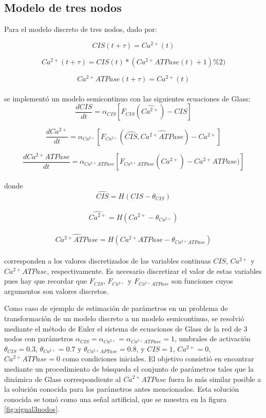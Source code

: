 \subsection{Modelo de tres nodos}

Para el modelo discreto de tres nodos, dado por:

\begin{equation}
CIS(t+\tau) = Ca^{2+}(t)
\end{equation}

\begin{equation}
Ca^{2+}(t+\tau) = CIS(t) * (Ca^{2+}ATPase(t) + 1) \% 2)
\end{equation}

\begin{equation}
Ca^{2+}ATPase(t+\tau) = Ca^{2+}(t)
\end{equation} 
\\
se implementó un modelo semicontinuo con las siguientes ecuaciones de Glass:
\begin{equation}
\frac{dCIS}{dt} = \alpha_{CIS} [F_{CIS}(\widehat{Ca^{2+}}) - CIS]
\end{equation}

\begin{equation}
\frac{dCa^{2+}}{dt} = \alpha_{Ca^{2+}} [F_{Ca^{2+}}(\widehat{CIS}, \widehat{Ca^{2+}ATPase}) - Ca^{2+}]
\end{equation}

\begin{equation}
\frac{dCa^{2+}ATPase}{dt} = \alpha_{Ca^{2+}ATPase} [F_{Ca^{2+}ATPase}(\widehat{Ca^{2+}}) - Ca^{2+}ATPase)]
\end{equation} 
\\
donde
$$\widehat{CIS} = H(CIS - \theta_{CIS})$$
\\
$$\widehat{Ca^{2+}} = H(Ca^{2+} - \theta_{Ca^{2+}})$$
\\
$$\widehat{Ca^{2+}ATPase} = H(Ca^{2+}ATPase - \theta_{Ca^{2+}ATPase})$$
\\
corresponden a los valores discretizados de las variables continuas $CIS$, $Ca^{2+}$ y $Ca^{2+}ATPase$, respectivamente. Es necesario discretizar el valor de estas variables pues hay que recordar que $F_{CIS}$, $F_{Ca^{2+}}$ y $F_{Ca^{2+}ATPase}$ son funciones cuyos argumentos son valores discretos.

Como caso de ejemplo de estimación de parámetros en un problema de transformación de un modelo discreto a un modelo semicontinuo, se resolvió mediante el método de Euler el sistema de ecuaciones de Glass de la red de 3 nodos con parámetros $\alpha_{CIS} = \alpha_{Ca^{2+}} =  \alpha_{Ca^{2+}ATPase} = 1$, umbrales de activación $\theta_{CIS} = 0.3$, $\theta_{Ca^{2+}} = 0.7$ y $\theta_{Ca^{2+}APTase} = 0.8$, y $CIS = 1$, $Ca^{2+} = 0$, $Ca^{2+}ATPase = 0$ como condiciones iniciales. El objetivo consistió en encontrar mediante un procedimiento de búsqueda el conjunto de parámetros tales que la dinámica de Glass correspondiente al $Ca^{2+}ATPase$ fuera lo más similar posible a la solución conocida para los parámetros antes mencionados. Esta solución conocida se tomó como una señal artificial, que se muestra en la figura \ref{fig:signal3nodos}.

